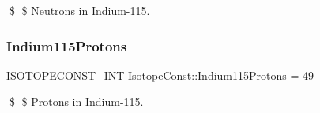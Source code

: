 \$ \$ Neutrons in Indium-\/115. \mbox{\label{group___isotope_const-_indium-_in115_gaf870fd0b01ce6d291b47f55ffbae4196}} 
\subsubsection{\texorpdfstring{Indium115\+Protons}{Indium115Protons}}
{\footnotesize\ttfamily \mbox{\hyperlink{group___isotope_const-_macros_ga5f18360b3e99483a35c32d789e62621c}{I\+S\+O\+T\+O\+P\+E\+C\+O\+N\+S\+T\+\_\+\+I\+NT}} Isotope\+Const\+::\+Indium115\+Protons = 49}

\$ \$ Protons in Indium-\/115. 